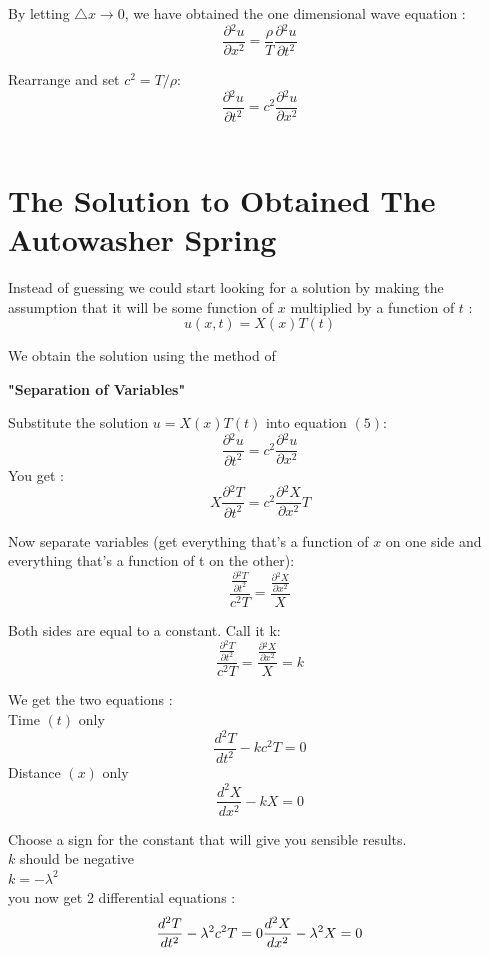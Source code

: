 \documentclass[12pt,a4paper]{article}
\begin{document}
	By letting $\triangle x \to 0$, we have obtained the one dimensional wave equation :
	$$\frac{\partial{^2 u}}{\partial{x^2}} = \frac {\rho}{T}\frac{\partial{^2 u}}{\partial{t^2}}$$
	
	Rearrange and set $c^2 = T/\rho$:
	\begin{equation}\label{}
	\frac{\partial{^2 u}}{\partial{t^2}} = c^2 \frac{\partial{^2 u}}{\partial{x^2}}
	\end{equation}\\
	
\part{The Solution to Obtained The Autowasher Spring}
	
	Instead of guessing we could start looking for a solution by making the assumption that it will be some function of $x$ multiplied by a function of $t$ :
	$$u(x,t) = X(x) T(t)$$
	
	We obtain the solution using the method of 
	\begin{center}
	\textbf{"Separation of Variables"}
	\end{center}

	Substitute the solution $u = X(x)T(t)$ into equation $(5)$:
	$$\frac{\partial{^2 u}}{\partial{t^2}} = c^2 \frac{\partial{^2 u}}{\partial{x^2}}$$
	You get :
	$$ X \frac{\partial{^2 T}}{\partial{t^2}} = c^2 \frac{\partial{^2 X}}{\partial{x^2}} T$$
	
	Now separate variables (get everything that's a function of $x$ on one side and everything that's a function of t on the other):
	$$\frac{\frac{\partial{^2 T}}{\partial{t^2}}}{c^2T} = \frac{\frac{\partial{^2 X}}{\partial{x^2}}}{X}$$
	
	Both sides are equal to a constant. Call it k:
	$$\frac{\frac{\partial{^2 T}}{\partial{t^2}}}{c^2T} = \frac{\frac{\partial{^2 X}}{\partial{x^2}}}{X} = k $$
	
	We get the two equations :\\
	Time $(t)$ only\\
	$$\frac{d^2T}{dt^2} - kc^2T = 0$$
	Distance $(x)$ only\\
	$$\frac{d^2X}{dx^2} - kX = 0$$
	
	Choose a sign for the constant that will give you sensible results.\\
	$k$ should be negative\\
	$k=-\lambda^2$\\
	you now get 2 differential equations :\\
	\begin{equation}\label{}
	{\frac{d^2T}{dt^2} - \lambda^2 c^2T = 0}\\
	{\frac{d^2X}{dx^2} - \lambda^2 X = 0}
	\end{equation}\\
	
\end{document}
